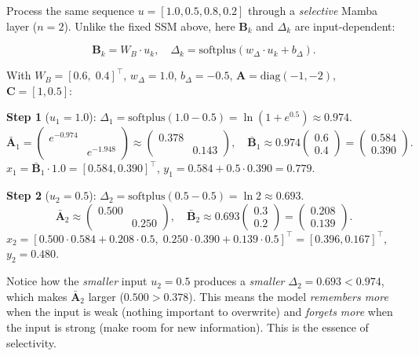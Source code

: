 \begin{example}
Process the same sequence $u = [1.0, 0.5, 0.8, 0.2]$ through a \emph{selective} Mamba layer ($n=2$). Unlike the fixed SSM above, here $\mathbf{B}_k$ and $\Delta_k$ are input-dependent:

\[
\mathbf{B}_k = W_B \cdot u_k, \quad \Delta_k = \text{softplus}(w_\Delta \cdot u_k + b_\Delta).
\]

With $W_B = [0.6,\; 0.4]^\top$, $w_\Delta = 1.0$, $b_\Delta = -0.5$, $\mathbf{A} = \text{diag}(-1, -2)$, $\mathbf{C} = [1, 0.5]$:

\textbf{Step 1} ($u_1 = 1.0$): $\Delta_1 = \text{softplus}(1.0 - 0.5) = \ln(1 + e^{0.5}) \approx 0.974$.
\[
\bar{\mathbf{A}}_1 = \begin{pmatrix}e^{-0.974}\\&e^{-1.948}\end{pmatrix} \approx \begin{pmatrix}0.378\\&0.143\end{pmatrix}, \quad \bar{\mathbf{B}}_1 \approx 0.974 \begin{pmatrix}0.6\\0.4\end{pmatrix} = \begin{pmatrix}0.584\\0.390\end{pmatrix}.
\]
$x_1 = \bar{\mathbf{B}}_1 \cdot 1.0 = [0.584, 0.390]^\top$, \quad $y_1 = 0.584 + 0.5 \cdot 0.390 = \mathbf{0.779}$.

\textbf{Step 2} ($u_2 = 0.5$): $\Delta_2 = \text{softplus}(0.5 - 0.5) = \ln 2 \approx 0.693$.
\[
\bar{\mathbf{A}}_2 \approx \begin{pmatrix}0.500\\&0.250\end{pmatrix}, \quad \bar{\mathbf{B}}_2 \approx 0.693 \begin{pmatrix}0.3\\0.2\end{pmatrix} = \begin{pmatrix}0.208\\0.139\end{pmatrix}.
\]
$x_2 = [0.500 \cdot 0.584 + 0.208 \cdot 0.5,\; 0.250 \cdot 0.390 + 0.139 \cdot 0.5]^\top = [0.396, 0.167]^\top$, \quad $y_2 = \mathbf{0.480}$.

Notice how the \emph{smaller} input $u_2 = 0.5$ produces a \emph{smaller} $\Delta_2 = 0.693 < 0.974$, which makes $\bar{\mathbf{A}}_2$ larger ($0.500 > 0.378$). This means the model \emph{remembers more} when the input is weak (nothing important to overwrite) and \emph{forgets more} when the input is strong (make room for new information). This is the essence of selectivity.
\end{example}

